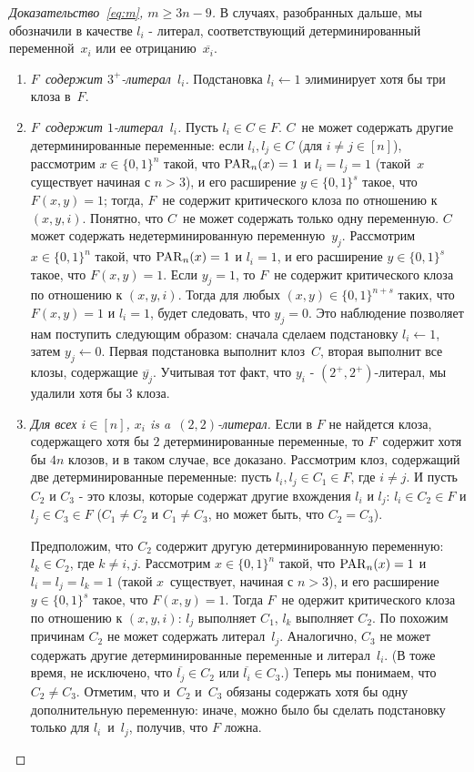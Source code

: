 \begin{proof}[Доказательство~\eqref{eq:m}, $m \ge 3n-9$]
	В случаях, разобранных дальше, мы обозначили
	в качестве $l_i$  - литерал, соответствующий детерминированный переменной~$x_i$ или ее отрицанию~$\overline{x_i}$.
	\begin{enumerate}
		\item \emph{$F$~содержит $3^+$-литерал~$l_i$.} Подстановка $l_i \gets 1$ элиминирует хотя бы три клоза в~$F$.
		
		\item \emph{$F$~содержит $1$-литерал~$l_i$.} 
		Пусть $l_i \in C \in F$. $C$~не может содержать другие детерминированные переменные: 
		если $l_i, l_j \in C$ (для $i \neq j \in [n]$), рассмотрим $x \in \{0,1\}^n$ такой, что
		$\operatorname{PAR}_n(x)=1$ и $l_i=l_j=1$ (такой~$x$ существует начиная с $n > 3$), 
		и его расширение $y \in \{0,1\}^s$ такое, что $F(x,y)=1$; тогда, $F$~не содержит
		критического клоза по отношению к $(x,y,i)$. 
		Понятно, что $C$~не может содержать только одну переменную. 
		$C$ может содержать недетерминированную переменную~$y_j$.
		Рассмотрим $x \in \{0,1\}^n$ такой, что $\operatorname{PAR}_n(x)=1$ и $l_i=1$, 
		и его расширение $y \in \{0,1\}^s$ такое, что $F(x,y)=1$. 
		Если $y_j=1$, то $F$~не содержит критического клоза по отношению к $(x,y,i)$. 
		Тогда для любых $(x,y) \in \{0,1\}^{n+s}$ таких, что $F(x,y)=1$ и $l_i=1$, 
		будет следовать, что $y_j=0$. 
		Это наблюдение позволяет нам поступить следующим образом: 
		сначала сделаем подстановку $l_i \gets 1$, затем $y_j \gets 0$. 
		Первая подстановка выполнит клоз~$C$, вторая выполнит все клозы, содержащие $\overline{y_j}$. 
		Учитывая тот факт, что $y_i$ - $(2^+, 2^+)$-литерал, мы удалили хотя бы $3$ клоза.
		
		\item\label{case:three} \emph{Для всех $i \in [n]$, $x_i$ is a~$(2,2)$-литерал.} Если в $F$ не найдется клоза, содержащего хотя бы $2$ детерминированные переменные, 
		то $F$~содержит хотя бы $4n$ клозов, и в таком случае, все доказано.
		Рассмотрим клоз, содержащий две детерминированные переменные:
		пусть $l_i,l_j \in C_1 \in F$, где $i \neq j$.
		И пусть $C_2$ и $C_3$ - это клозы, которые содержат другие вхождения $l_i$ и $l_j$:
		$l_i \in C_2 \in F$ и $l_j \in C_3 \in F$ 
		($C_1 \neq C_2$ и $C_1 \neq C_3$, но может быть, что $C_2=C_3$).
		
		Предположим, что $C_2$ содержит другую детерминированную переменную: $l_k \in C_2$, где $k \neq i,j$.
		Рассмотрим $x \in \{0,1\}^n$ такой, что $\operatorname{PAR}_n(x)=1$ и $l_i=l_j=l_k=1$
		(такой $x$~существует, начиная с $n>3$), и его расширение $y \in \{0,1\}^s$ такое, что $F(x,y)=1$. Тогда $F$~не одержит критического клоза по отношению к $(x,y,i)$:
		$l_j$ выполняет $C_1$, $l_k$ выполняет $C_2$. 
		По похожим причинам $C_2$ не может содержать литерал~$l_j$. 
		Аналогично, $C_3$ не может содержать другие детерминированные переменные и литерал~$l_i$.
		(В тоже время, не исключено, что $\overline{l_j} \in C_2$ или
		$\overline{l_i} \in C_3$.)
		Теперь мы понимаем, что $C_2 \neq C_3$. 
		Отметим, что и~$C_2$ и~$C_3$ обязаны содержать хотя бы одну дополнительную переменную:
		иначе, можно было бы сделать подстановку только для $l_i$~и~$l_j$, получив, что $F$ ложна.
		

\end{enumerate}
\end{proof}
